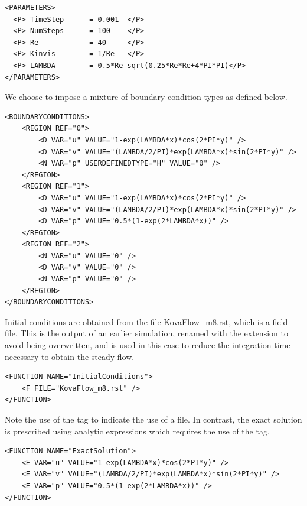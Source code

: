 \begin{lstlisting}[style=XMLStyle]
<PARAMETERS>
  <P> TimeStep      = 0.001  </P>
  <P> NumSteps      = 100    </P>
  <P> Re            = 40     </P>
  <P> Kinvis        = 1/Re   </P>
  <P> LAMBDA        = 0.5*Re-sqrt(0.25*Re*Re+4*PI*PI)</P>
</PARAMETERS>
\end{lstlisting}

We choose to impose a mixture of boundary condition types as defined below.

\begin{lstlisting}[style=XMLStyle]
<BOUNDARYCONDITIONS>
    <REGION REF="0">
        <D VAR="u" VALUE="1-exp(LAMBDA*x)*cos(2*PI*y)" />
        <D VAR="v" VALUE="(LAMBDA/2/PI)*exp(LAMBDA*x)*sin(2*PI*y)" />
        <N VAR="p" USERDEFINEDTYPE="H" VALUE="0" />
    </REGION>
    <REGION REF="1">
        <D VAR="u" VALUE="1-exp(LAMBDA*x)*cos(2*PI*y)" />
        <D VAR="v" VALUE="(LAMBDA/2/PI)*exp(LAMBDA*x)*sin(2*PI*y)" />
        <D VAR="p" VALUE="0.5*(1-exp(2*LAMBDA*x))" />
    </REGION>
    <REGION REF="2">
        <N VAR="u" VALUE="0" />
        <D VAR="v" VALUE="0" />
        <N VAR="p" VALUE="0" />
    </REGION>
</BOUNDARYCONDITIONS>
\end{lstlisting}

Initial conditions are obtained from the file KovaFlow\_m8.rst, which is
a \nekpp field file. This is the output of an earlier simulation, renamed with
the extension  to avoid being overwritten, and is used in this case
to reduce the integration time necessary to obtain the steady flow.
\begin{lstlisting}[style=XMLStyle]
<FUNCTION NAME="InitialConditions">
    <F FILE="KovaFlow_m8.rst" />
</FUNCTION>
\end{lstlisting}
Note the use of the  tag to indicate the use of a file. In contrast,
the exact solution is prescribed using analytic expressions which requires the
use of the  tag.
\begin{lstlisting}[style=XMLStyle]
<FUNCTION NAME="ExactSolution">
    <E VAR="u" VALUE="1-exp(LAMBDA*x)*cos(2*PI*y)" />
    <E VAR="v" VALUE="(LAMBDA/2/PI)*exp(LAMBDA*x)*sin(2*PI*y)" />
    <E VAR="p" VALUE="0.5*(1-exp(2*LAMBDA*x))" />
</FUNCTION>
\end{lstlisting}

